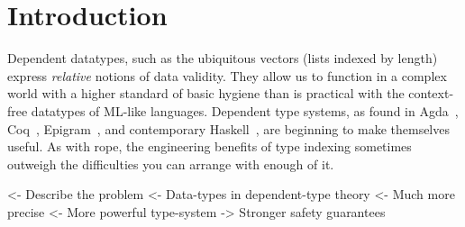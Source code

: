 \documentclass[preprint
              , authoryear
              ]{sigplanconf}
\newenvironment{wstructure}{\comment}{\endcomment}
\begin{document}






\section{Introduction}

Dependent datatypes, such as the ubiquitous vectors (lists indexed by
length) express \emph{relative} notions of data validity. They allow
us to function in a complex world with a higher standard of basic
hygiene than is practical with the context-free datatypes of ML-like
languages. Dependent type systems, as found in
Agda~\cite{norell:agda}, Coq~\cite{coq},
Epigram~\cite{mcbride.mckinna:view-from-the-left}, and contemporary
Haskell~\cite{spj:gadt}, are beginning to make themselves useful. As
with rope, the engineering benefits of type indexing sometimes
outweigh the difficulties you can arrange with enough of it.


\begin{wstructure}
<- Describe the problem
    <- Data-types in dependent-type theory
        <- Much more precise
            <- More powerful type-system
            -> Stronger safety guarantees
\end{wstructure}

\end{document}
